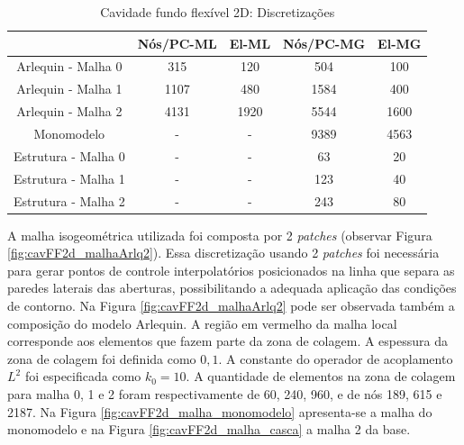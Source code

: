 	\begin{center}
		\begin{table}[!htbp]
			\caption{Cavidade fundo flexível 2D: Discretizações}
			\centering
			\begin{tabular}{ccccc} 
				\toprule
				\ &  Nós/PC-ML & El-ML & Nós/PC-MG & El-MG  \\ 
				\midrule \midrule
				Arlequin - Malha 0 & 315 & 120 & 504 & 100 \\ 
				\midrule
				Arlequin - Malha 1 & 1107 & 480 & 1584 & 400\\
				\midrule
				Arlequin - Malha 2 & 4131 & 1920 & 5544 & 1600\\
				\midrule
				Monomodelo & - & - & 9389 & 4563\\
				\midrule
				Estrutura - Malha 0 & - & - &  63 & 20\\
				\midrule
				Estrutura - Malha 1 & - & - &  123 & 40\\
				\midrule
				Estrutura - Malha 2 & - & - &  243 & 80 \\
				\midrule
			\end{tabular}
			\label{tab:CF2DD}
		\end{table}
	\end{center}

A malha isogeométrica utilizada foi composta por 2 \textit{patches} (observar Figura \ref{fig:cavFF2d_malhaArlq2}). Essa discretização usando 2 \textit{patches} foi necessária para gerar pontos de controle interpolatórios posicionados na linha que separa as paredes laterais das aberturas, possibilitando a adequada aplicação das condições de contorno. Na Figura \ref{fig:cavFF2d_malhaArlq2} pode ser observada também a composição do modelo Arlequin. A região em vermelho da malha local corresponde aos elementos que fazem parte da zona de colagem.  A espessura da zona de colagem foi definida como $0,1$. A constante do operador de acoplamento $L^{2}$ foi especificada como $k_{0} = 10$. A quantidade de elementos na zona de colagem para malha 0, 1 e 2  foram respectivamente de 60, 240, 960, e de nós 189, 615 e 2187. Na Figura \ref{fig:cavFF2d_malha_monomodelo} apresenta-se a malha do monomodelo e na Figura \ref{fig:cavFF2d_malha_casca} a malha 2 da base.


